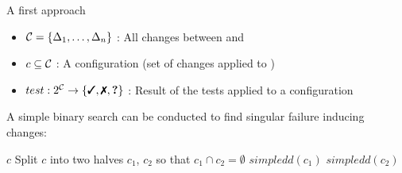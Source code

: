 \begin{frame}{A first approach}
	\begin{itemize}
		\item $\mathcal{C} = \left\{ \Delta_1, \dots, \Delta_n \right\}$ : All changes between \yd and \td
		\item $c \subseteq \mathcal{C}$ : A configuration (set of changes applied to \yd)
		\item $test: 2^{\C} \to \set{\cmark,\xmark,\qmark}$ : Result of the tests applied to a configuration
	\end{itemize}
	
	\bigskip

	A simple binary search can be conducted to find singular failure inducing changes:\\[.5em]

	\begin{algorithmic}[1]
			 \Return $c$ \EndIf
			\State Split $c$ into two halves $c_1$, $c_2$ so that $c_1 \cap c_2 = \emptyset$
			 \Return $simpledd(c_1)$ \Else{} \Return $simpledd(c_2)$
			\EndIf
		\EndFunction
	\end{algorithmic}
\end{frame}

